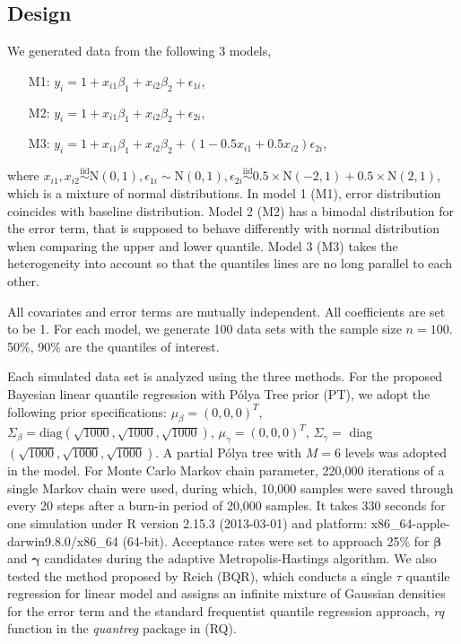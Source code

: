 \documentclass[12pt]{article}
\newcommand{\polya}{P\'{o}lya}
\begin{document}
\subsection{Design}
We generated data from the following 3 models,
\begin{itemize}
\item [M1:] $y_i = 1 + x_{i1}\beta_1 + x_{i2}\beta_2 + \epsilon_{1i}$,
\item [M2:] $y_i = 1 + x_{i1}\beta_1 + x_{i2}\beta_2 + \epsilon_{2i}$,
\item [M3:] $y_i = 1 + x_{i1}\beta_1 + x_{i2}\beta_2 +
  (1-0.5x_{i1}+0.5x_{i2}) \epsilon_{2i}$,
\end{itemize}
where $x_{i1}, x_{i2} \stackrel{\text{iid}}{\sim} \mathrm{N}(0,1),
\epsilon_{1i} \sim \mathrm{N}(0,1), \epsilon_{2i}
\stackrel{\text{iid}}{\sim} 0.5 \times \mathrm{N}(-2,1) + 0.5 \times
\mathrm{N}(2,1) $, which is a mixture of normal distributions.  In
model 1 (M1), error distribution coincides with baseline
distribution. Model 2 (M2) has a bimodal distribution for the error
term, that is supposed to behave differently with normal distribution
when comparing the upper and lower quantile. Model 3 (M3) takes the
heterogeneity into account so that the quantiles lines are no long
parallel to each other.

All covariates and error terms are mutually independent. All
coefficients are set to be 1. For each model, we generate 100 data
sets with the sample size $n=100$. 50\%, 90\% are the quantiles of
interest.

Each simulated data set is analyzed using the three methods. For the
proposed Bayesian linear quantile regression with \polya{} Tree prior
(PT), we adopt the following prior specifications: $\mu_{\beta} =
(0,0,0)^T$, $\Sigma_{\beta}=\text{diag}
(\sqrt{1000},\sqrt{1000},\sqrt{1000})$, $\mu_{\gamma} = (0,0,0)^T$,
$\Sigma_{\gamma}=$ diag $(\sqrt{1000},\sqrt{1000},\sqrt{1000})$. A
partial \polya{} tree with $M=6$ levels was adopted in the model. For
Monte Carlo Markov chain parameter, 220,000 iterations of a single
Markov chain were used, during which, 10,000 samples were saved
through every 20 steps after a burn-in period of 20,000 samples.  It
takes 330 seconds for one simulation under R version 2.15.3
(2013-03-01) and platform: x86\_64-apple-darwin9.8.0/x86\_64
(64-bit). Acceptance rates were set to approach 25\% for $\bm{\beta}$
and $\bm{\gamma}$ candidates during the adaptive Metropolis-Hastings
algorithm.  We also tested the method proposed by Reich (BQR), which
conducts a single $\tau$ quantile regression for linear model and
assigns an infinite mixture of Gaussian densities for the error term
and the standard frequentist quantile regression approach, \textit{rq}
function in the \textit{quantreg} package \citep{quantreg} in \cite{R}
(RQ).
\end{document}
